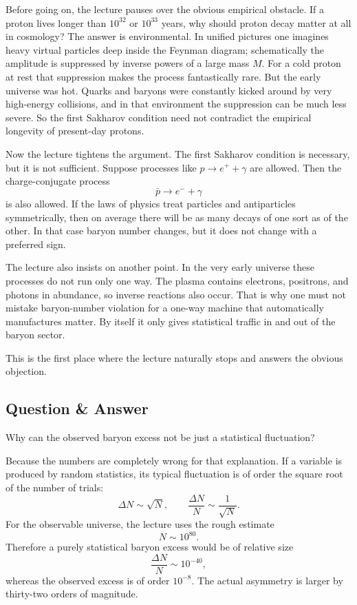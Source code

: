 Before going on, the lecture pauses over the obvious empirical obstacle. If a proton lives longer than \(10^{32}\) or \(10^{33}\) years, why should proton decay matter at all in cosmology? The answer is environmental. In unified pictures one imagines heavy virtual particles deep inside the Feynman diagram; schematically the amplitude is suppressed by inverse powers of a large mass \(M\). For a cold proton at rest that suppression makes the process fantastically rare. But the early universe was hot. Quarks and baryons were constantly kicked around by very high-energy collisions, and in that environment the suppression can be much less severe. So the first Sakharov condition need not contradict the empirical longevity of present-day protons.

Now the lecture tightens the argument. The first Sakharov condition is necessary, but it is not sufficient. Suppose processes like \(p\to e^+ + \gamma\) are allowed. Then the charge-conjugate process
\begin{equation}
\bar p \to e^- + \gamma
\end{equation}
is also allowed. If the laws of physics treat particles and antiparticles symmetrically, then on average there will be as many decays of one sort as of the other. In that case baryon number changes, but it does not change with a preferred sign.

The lecture also insists on another point. In the very early universe these processes do not run only one way. The plasma contains electrons, positrons, and photons in abundance, so inverse reactions also occur. That is why one must not mistake baryon-number violation for a one-way machine that automatically manufactures matter. By itself it only gives statistical traffic in and out of the baryon sector.

This is the first place where the lecture naturally stops and answers the obvious objection.

\subsection{Question \& Answer}

Why can the observed baryon excess not be just a statistical fluctuation?

Because the numbers are completely wrong for that explanation. If a variable is produced by random statistics, its typical fluctuation is of order the square root of the number of trials:
\begin{equation}
\Delta N \sim \sqrt{N},
\qquad
\frac{\Delta N}{N}\sim \frac{1}{\sqrt{N}}.
\end{equation}
For the observable universe, the lecture uses the rough estimate
\begin{equation}
N \sim 10^{80}.
\end{equation}
Therefore a purely statistical baryon excess would be of relative size
\begin{equation}
\frac{\Delta N}{N}\sim 10^{-40},
\end{equation}
whereas the observed excess is of order \(10^{-8}\). The actual asymmetry is larger by thirty-two orders of magnitude.

